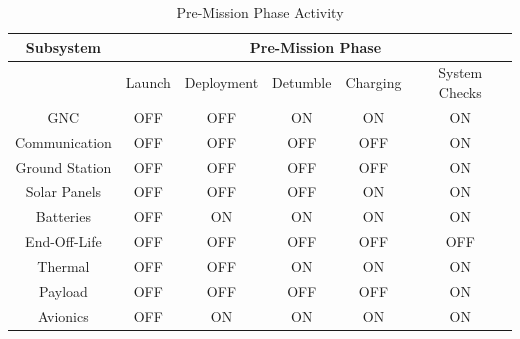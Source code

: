 \documentclass{ece}
\begin{document}
\begin{table}[htbp]
  \centering
  \caption{Pre-Mission Phase Activity}
    \begin{tabular}{|c|c|c|c|c|c|}
    \hline
    \textbf{Subsystem} & \multicolumn{5}{c|}{\textbf{Pre-Mission Phase}} \\
\midrule
          & \multicolumn{1}{c}{Launch} & \multicolumn{1}{c}{Deployment} & \multicolumn{1}{c}{Detumble} & \multicolumn{1}{c}{Charging} & System Checks \\
    GNC   & \cellcolor[rgb]{ .753,  0,  0}OFF & \cellcolor[rgb]{ .753,  0,  0}OFF & \cellcolor[rgb]{ .573,  .816,  .314}ON & \cellcolor[rgb]{ .573,  .816,  .314}ON & \cellcolor[rgb]{ .573,  .816,  .314}ON \\
    Communication & \cellcolor[rgb]{ .753,  0,  0}OFF & \cellcolor[rgb]{ .753,  0,  0}OFF & \cellcolor[rgb]{ .753,  0,  0}OFF & \cellcolor[rgb]{ .753,  0,  0}OFF & \cellcolor[rgb]{ .573,  .816,  .314}ON \\
    Ground Station & \cellcolor[rgb]{ .753,  0,  0}OFF & \cellcolor[rgb]{ .753,  0,  0}OFF & \cellcolor[rgb]{ .753,  0,  0}OFF & \cellcolor[rgb]{ .753,  0,  0}OFF & \cellcolor[rgb]{ .573,  .816,  .314}ON \\
    Solar Panels  & \cellcolor[rgb]{ .753,  0,  0}OFF & \cellcolor[rgb]{ .753,  0,  0}OFF & \cellcolor[rgb]{ .753,  0,  0}OFF & \cellcolor[rgb]{ .573,  .816,  .314}ON & \cellcolor[rgb]{ .573,  .816,  .314}ON \\
   Batteries  & \cellcolor[rgb]{ .753,  0,  0}OFF & \cellcolor[rgb]{ .573,  .816,  .314}ON & \cellcolor[rgb]{ .573,  .816,  .314}ON & \cellcolor[rgb]{ .573,  .816,  .314}ON & \cellcolor[rgb]{ .573,  .816,  .314}ON \\
    End-Off-Life & \cellcolor[rgb]{ .753,  0,  0}OFF & \cellcolor[rgb]{ .753,  0,  0}OFF & \cellcolor[rgb]{ .753,  0,  0}OFF & \cellcolor[rgb]{ .753,  0,  0}OFF & \cellcolor[rgb]{ .753,  0,  0}OFF \\
   Thermal  & \cellcolor[rgb]{ .753,  0,  0}OFF & \cellcolor[rgb]{ .753,  0,  0}OFF & \cellcolor[rgb]{ .573,  .816,  .314}ON & \cellcolor[rgb]{ .573,  .816,  .314}ON & \cellcolor[rgb]{ .573,  .816,  .314}ON \\
   Payload & \cellcolor[rgb]{ .753,  0,  0}OFF & \cellcolor[rgb]{ .753,  0,  0}OFF & \cellcolor[rgb]{ .753,  0,  0}OFF & \cellcolor[rgb]{ .753,  0,  0}OFF & \cellcolor[rgb]{ .573,  .816,  .314}ON \\
    Avionics & \cellcolor[rgb]{ .753,  0,  0}OFF & \cellcolor[rgb]{ .573,  .816,  .314}ON & \cellcolor[rgb]{ .573,  .816,  .314}ON & \cellcolor[rgb]{ .573,  .816,  .314}ON & \cellcolor[rgb]{ .573,  .816,  .314}ON \\
    \hline
    \end{tabular}
  \label{tab:on1}
\end{table}
\end{document}
